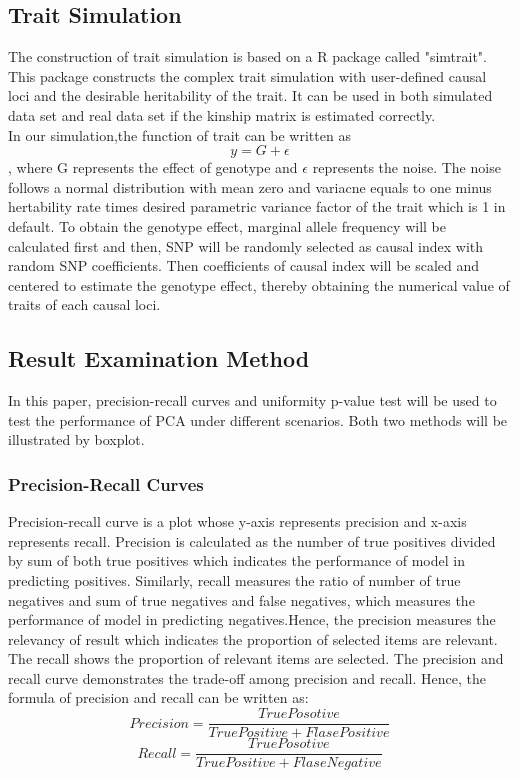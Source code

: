\documentclass[12pt]{article}
\begin{document}
\subsection{Trait Simulation}
The construction of trait simulation is based on a R package called "simtrait". This package constructs the complex trait simulation with user-defined causal loci and the desirable heritability of the trait. It can be used in both simulated data set and real data set if the kinship matrix is estimated correctly. \\
In our simulation,the function of trait can be written as $$y=G+ \epsilon$$ 
, where G represents the effect of genotype and $\epsilon$ represents the noise.  The noise follows a normal distribution with mean zero and variacne  equals to one minus hertability rate times desired parametric variance factor of the trait which is 1 in default. To obtain the genotype effect, marginal allele frequency will be calculated first and then, SNP will be randomly selected as causal index with random SNP coefficients. Then  coefficients of causal index will be scaled and centered to estimate the genotype effect, thereby obtaining the numerical value of traits of each causal loci.


\subsection{Result Examination Method}
In this paper, precision-recall curves and uniformity p-value test will be used to test the performance of PCA under different scenarios. Both two methods will be illustrated by boxplot.
\subsubsection{Precision-Recall Curves}
Precision-recall curve is a plot whose y-axis represents precision and x-axis represents recall. Precision is calculated as the number of true positives divided by sum of both true positives which indicates the performance of model in predicting positives. Similarly, recall measures the ratio of number of true negatives and sum of true negatives and false negatives, which measures the performance of model in predicting negatives.Hence, the precision measures the relevancy of result which indicates the proportion of selected items are relevant. The recall shows the proportion of relevant items are selected. The precision and recall curve demonstrates the trade-oﬀ among precision and recall. Hence, the formula of precision and recall can be written as:
$$Precision=\frac{True Posotive}{True Positive+Flase Positive}$$
$$Recall=\frac{True Posotive}{True Positive+Flase Negative}$$
\end{document}
